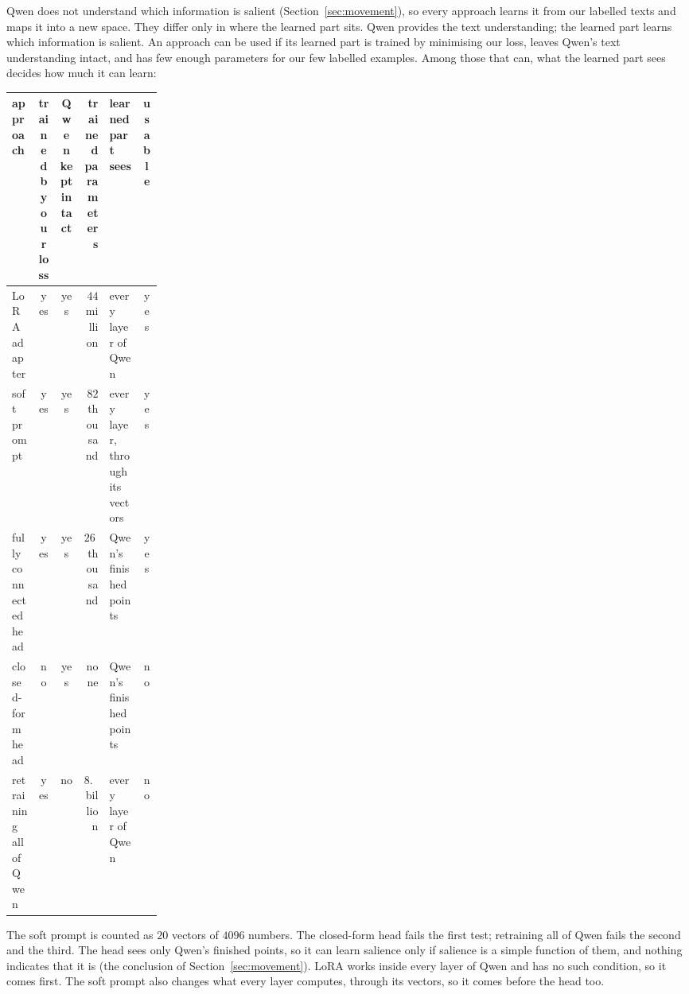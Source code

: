 \documentclass[11pt]{article}
\theoremstyle{remark}
\begin{document}
Qwen does not understand which information is salient (Section~\ref{sec:movement}), so every approach learns it from our labelled texts and maps it into a new space. They differ only in where the learned part sits. Qwen provides the text understanding; the learned part learns which information is salient. An approach can be used if its learned part is trained by minimising our loss, leaves Qwen's text understanding intact, and has few enough parameters for our few labelled examples. Among those that can, what the learned part sees decides how much it can learn:
\begin{center}
\small
\begin{tabular}{@{}l c c r p{0.22\linewidth} c@{}}
\hline
approach & \shortstack{trained by\\our loss} & \shortstack{Qwen\\kept intact} & \shortstack{trained\\parameters} & \shortstack{learned\\part sees} & usable \\
\hline
LoRA adapter & yes & yes & $44$ million & every layer of Qwen & yes \\
soft prompt & yes & yes & $82$ thousand & every layer, through its vectors & yes \\
fully connected head & yes & yes & $262$ thousand & Qwen's finished points & yes \\
closed-form head & no & yes & none & Qwen's finished points & no \\
retraining all of Qwen & yes & no & $8.2$ billion & every layer of Qwen & no \\
\hline
\end{tabular}
\end{center}
The soft prompt is counted as $20$ vectors of $4096$ numbers. The closed-form head fails the first test; retraining all of Qwen fails the second and the third. The head sees only Qwen's finished points, so it can learn salience only if salience is a simple function of them, and nothing indicates that it is (the conclusion of Section~\ref{sec:movement}). LoRA works inside every layer of Qwen and has no such condition, so it comes first. The soft prompt also changes what every layer computes, through its vectors, so it comes before the head too.
\end{document}
